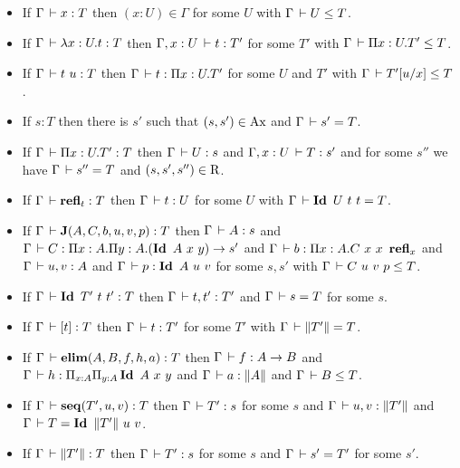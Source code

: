 \documentclass[a4paper,english]{lipics-utf8x}
\begin{document}
  \begin{lemma}[Inversion]
    \label{lem:inversion}
    \leavevmode
    \begin{itemize}
      \item If $\Gamma \,\vdash x : T$ then $(x:U) \in \Gamma$ for some
      $U$ with $\Gamma \,\vdash U \le T$.
      \item If $\Gamma \,\vdash \lambda x:U.t : T$ then $\Gamma, x:U \,\vdash t : T'$
      for some $T'$ with $\Gamma \,\vdash \Pi x:U.T' \le T$.
      \item If $\Gamma \,\vdash t\ u : T$ then $\Gamma \,\vdash t : \Pi x:U.T'$
      for some $U$ and $T'$ with $\Gamma \,\vdash T'[u/x] \le T$.
      \item If $s : T$ then there is $s'$ such that $(s,s') \in \operatorname{Ax}$
      and $\Gamma \,\vdash s' = T$.
      \item If $\Gamma \,\vdash \Pi x:U.T' : T$ then $\Gamma \,\vdash U : s$
      and $\Gamma, x:U \,\vdash T : s'$ and for some $s''$ we have
      $\Gamma \,\vdash s'' = T$ and $(s,s',s'') \in \operatorname{R}$.
      \item If $\Gamma \,\vdash \operatorname{\mathbf{refl}}_t : T$ then $\Gamma \,\vdash t : U$
      for some $U$ with $\Gamma \,\vdash \operatorname{\mathbf{Id}~} U\ t\ t = T$.
      \item If $\Gamma \,\vdash \operatorname{\mathbf{J}}(A,C,b,u,v,p) : T$ then $\Gamma \,\vdash A : s$
      and $\Gamma \der C : \Pi x:A. \Pi y:A. (\Id A\ x\ y) \to s'$ and
      $\Gamma \,\vdash b : \Pi x:A. C\ x\ x\ \operatorname{\mathbf{refl}}_x$ and $\Gamma \,\vdash u, v : A$
      and $\Gamma \der p : \Id A\ u\ v$ for some $s,s'$ with
      $\Gamma \,\vdash C\ u\ v\ p \le T$.
      \item If $\Gamma \,\vdash \operatorname{\mathbf{Id}~} T'\ t\ t' : T$ then $\Gamma \,\vdash t,t' : T'$
      and $\Gamma \,\vdash s = T$ for some $s$.
      \item If $\Gamma \,\vdash [t] : T$ then $\Gamma \,\vdash t : T'$ for some
      $T'$ with $\Gamma \,\vdash \|T'\| = T$.
      \item If $\Gamma \,\vdash \operatorname{\mathbf{elim}}(A,B,f,h,a) : T$ then
      $\Gamma \,\vdash f : A \to B$ and
      $\Gamma \,\vdash h : \Pi_{x:A} \Pi_{y:A} \operatorname{\mathbf{Id}~} A\ x\ y$
      and $\Gamma \,\vdash a : \|A\|$ and $\Gamma \,\vdash B \le T$.
      \item If $\Gamma \,\vdash \operatorname{\mathbf{seq}}(T',u,v) : T$ then $\Gamma \,\vdash T' : s$ for
      some $s$ and $\Gamma \,\vdash u, v : \|T'\|$ and
      $\Gamma \der T = \Id \squash{T'}\ u\ v$.
      \item If $\Gamma \,\vdash \|T'\| : T$ then $\Gamma \,\vdash T' : s$ for
      some $s$ and $\Gamma \,\vdash s' = T'$ for some $s'$.
    \end{itemize}
  \end{lemma}
\end{document}
